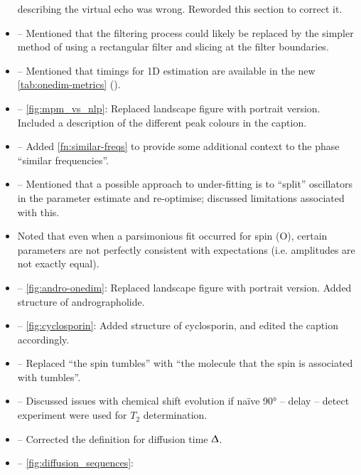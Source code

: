 \documentclass[12pt]{article}
\begin{document}
\begin{itemize}
            describing the virtual echo was wrong. Reworded this section to
            correct it.
        \item {} -- Mentioned that the filtering
            process could likely be replaced by the simpler method of using a
            rectangular filter and slicing at the filter boundaries.
        \item {} -- Mentioned that timings for 1D
            estimation are available in the new \cref{tab:onedim-metrics}
            ().
        \item {} -- \cref{fig:mpm_vs_nlp}: Replaced
            landscape figure with portrait version. Included a description of the
            different peak colours in the caption.
        \item {} -- Added \cref{fn:similar-freqs} to
            provide some additional context to the phase ``similar frequencies''.
        \item {} -- Mentioned that a possible approach
            to under-fitting is to ``split'' oscillators in the parameter
            estimate and re-optimise; discussed limitations associated with
            this.
        \item {} Noted that even when a parsimonious fit
            occurred for spin (O), certain parameters are not perfectly consistent
            with expectations (i.e. amplitudes are not exactly equal).
        \item {} -- \cref{fig:andro-onedim}: Replaced
            landscape figure with portrait version. Added structure of andrographolide.
        \item {} -- \cref{fig:cyclosporin}: Added structure of
            cyclosporin, and edited the caption accordingly.
        \item {} -- Replaced ``the spin tumbles''
            with ``the molecule that the spin is associated with tumbles''.
        \item {} -- Discussed issues with chemical shift
            evolution if na\"ive \ang{90} -- delay -- detect experiment were
            used for $T_2$ determination.
        \item {} -- Corrected the definition for
            diffusion time $\Updelta$.
        \item {} -- \cref{fig:diffusion_sequences}:

\end{itemize}
\end{document}

